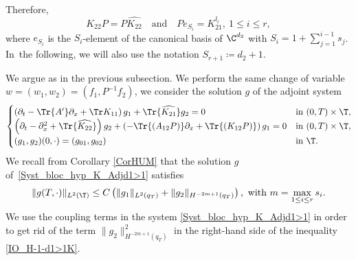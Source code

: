 Therefore,
\begin{equation}
K_{22} P = P\widehat{K_{22}}\quad \text{and}\quad P e_{S_i} = K_{21}^{l_i},\ 1 \leq i \leq r,
\label{RelationK22PK21}
\end{equation}
where $e_{S_i}$ is the $S_i$-element of the canonical basis of $\C^{d_2}$ with $S_i = 1 +
\sum_{j=1}^{i-1} s_j$. In~the following, we will also use the notation $S_{r+1}\coloneqq
d_2+1$.

We argue as in the previous subsection. We perform the same change of variable $w =(w_1,w_2) = (f_1,P^{-1}f_2)$, we consider the solution $g$ of the adjoint system \begin{equation} \label{Syst_bloc_hyp_K_Adjd1>1}
\begin{cases}
\left(\partial_t -\Tr{A'}\partial_x+\Tr K_{11}\right)g_1 +\Tr{\widehat{K_{21}}} g_2= 0
&\text{in}\ (0,T)\times \T,\!\\
\left(\partial_t - \partial_x^2+\Tr{\widehat{K_{22}}}\right)g_2 +\left(-\Tr{(A_{12}P)}\partial_x+\Tr{(K_{12}P)}\right)g_1 = 0 &\text{in}\ (0,T)\times \T,\!\\
(g_1,g_2)(0,\cdot)=(g_{01},g_{02}) & \text{in}\ \T.
\end{cases}
\end{equation}
We recall from Corollary \ref{CorHUM} that the solution $g$ of~\eqref{Syst_bloc_hyp_K_Adjd1>1} satisfies
\begin{equation} \label{IO_H-1-d1>1K}
\| g(T,\cdot) \|_{L^2(\T)} \leq C \left(\| g_1\|_{L^2(q_T)} + \|g_2\|_{H^{-2m+1}(q_T)} \right),\ \text{with}\ m=\max_{1 \leq i \leq r}s_i.
\end{equation}
We use the coupling terms in the system \eqref{Syst_bloc_hyp_K_Adjd1>1} in order to get rid of the term $\|g_2\|_{H^{-2m+1}(q_T)}^2$ in the right-hand side of the inequality \eqref{IO_H-1-d1>1K}.

